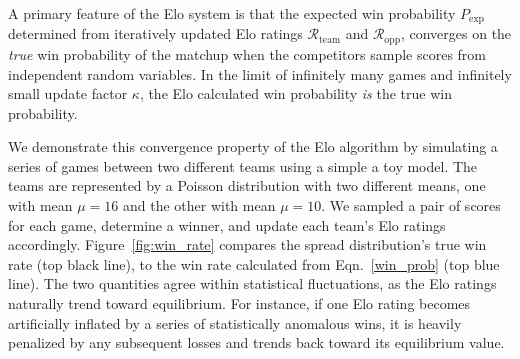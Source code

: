 \documentclass[aps,prc,reprint,amsmath,superscriptaddress]{revtex4-1}
\newcommand{\R}{\mathcal{R}}
\begin{document}
A primary feature of the Elo system is that the expected win probability $P_\text{exp}$ determined from iteratively updated Elo ratings $\R_\text{team}$ and $\R_\text{opp}$, converges on the \emph{true} win probability of the matchup when the competitors sample scores from independent random variables.
In the limit of infinitely many games and infinitely small update factor $\kappa$, the Elo calculated win probability \emph{is} the true win probability.

We demonstrate this convergence property of the Elo algorithm by simulating a series of games between two different teams using a simple a toy model.
The teams are represented by a Poisson distribution with two different means, one with mean $\mu=16$ and the other with mean $\mu=10$.
We sampled a pair of scores for each game, determine a winner, and update each team's Elo ratings accordingly.
Figure~\ref{fig:win_rate} compares the spread distribution's true win rate (top black line), to the win rate calculated from Eqn.~\eqref{win_prob} (top blue line).
The two quantities agree within statistical fluctuations, as the Elo ratings naturally trend toward equilibrium.
For instance, if one Elo rating becomes artificially inflated by a series of statistically anomalous wins, it is heavily penalized by any subsequent losses and trends back toward its equilibrium value.
\end{document}
